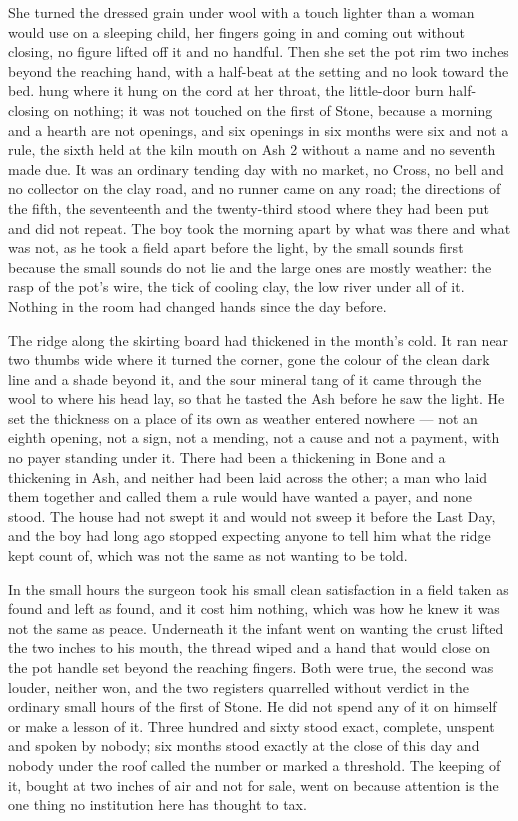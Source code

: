 She turned the dressed grain under wool with a touch lighter than a woman would use on a sleeping child, her fingers going in and coming out without closing, no figure lifted off it and no handful. Then she set the pot rim two inches beyond the reaching hand, with a half-beat at the setting and no look toward the bed.  hung where it hung on the cord at her throat, the little-door burn half-closing on nothing; it was not touched on the first of Stone, because a morning and a hearth are not openings, and six openings in six months were six and not a rule, the sixth held at the kiln mouth on Ash 2 without a name and no seventh made due. It was an ordinary tending day with no market, no Cross, no bell and no collector on the clay road, and no runner came on any road; the directions of the fifth, the seventeenth and the twenty-third stood where they had been put and did not repeat. The boy took the morning apart by what was there and what was not, as he took a field apart before the light, by the small sounds first because the small sounds do not lie and the large ones are mostly weather: the rasp of the pot's wire, the tick of cooling clay, the low river under all of it. Nothing in the room had changed hands since the day before.

The ridge along the skirting board had thickened in the month's cold. It ran near two thumbs wide where it turned the corner, gone the colour of the clean dark line and a shade beyond it, and the sour mineral tang of it came through the wool to where his head lay, so that he tasted the Ash before he saw the light. He set the thickness on a place of its own as weather entered nowhere --- not an eighth opening, not a sign, not a mending, not a cause and not a payment, with no payer standing under it. There had been a thickening in Bone and a thickening in Ash, and neither had been laid across the other; a man who laid them together and called them a rule would have wanted a payer, and none stood. The house had not swept it and would not sweep it before the Last Day, and the boy had long ago stopped expecting anyone to tell him what the ridge kept count of, which was not the same as not wanting to be told.

\scenebreak

In the small hours the surgeon took his small clean satisfaction in a field taken as found and left as found, and it cost him nothing, which was how he knew it was not the same as peace. Underneath it the infant went on wanting the crust lifted the two inches to his mouth, the thread wiped and a hand that would close on the pot handle set beyond the reaching fingers. Both were true, the second was louder, neither won, and the two registers quarrelled without verdict in the ordinary small hours of the first of Stone. He did not spend any of it on himself or make a lesson of it. Three hundred and sixty stood exact, complete, unspent and spoken by nobody; six months stood exactly at the close of this day and nobody under the roof called the number or marked a threshold. The keeping of it, bought at two inches of air and not for sale, went on because attention is the one thing no institution here has thought to tax.

